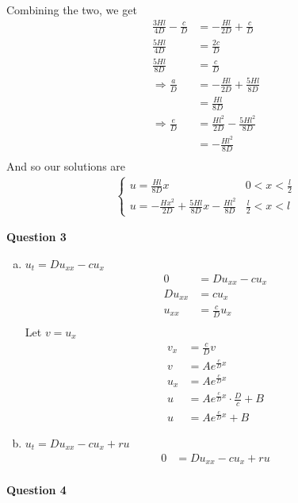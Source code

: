 \documentclass[12pt, letterpaper]{article}
\begin{document}
\begin{enumerate}[(a)]
\begin{enumerate}[(i)]
\begin{align*}
        \end{align*}
        Combining the two, we get
        \begin{align*}
            \frac{3Hl}{4D} - \frac cD &= -\frac{Hl}{2D} + \frac cD \\
            \frac{5Hl}{4D} &= \frac{2c}{D} \\
            \frac{5Hl}{8D} &= \frac cD \\
            \Rightarrow \frac aD &= -\frac{Hl}{2D} + \frac{5Hl}{8D} \\
            &= \frac{Hl}{8D} \\
            \Rightarrow \frac eD &= \frac{Hl^2}{2D} - \frac{5Hl^2}{8D} \\
            &= -\frac{Hl^2}{8D} \\
        \end{align*}
        And so our solutions are
        \begin{align*}
            \begin{cases}
                u = \displaystyle\frac{Hl}{8D}x  & 0 < x < \frac l2\\
                u = -\displaystyle\frac{Hx^2}{2D} + \frac{5Hl}{8D}x - \frac{Hl^2}{8D} & \frac l2 < x < l
            \end{cases}
        \end{align*}
    \end{enumerate}
\end{enumerate}

\noindent \textbf{Question 3}
\begin{enumerate}[(a)]
    \item $u_t = Du_{xx} - cu_x$ 
    \begin{align*}
        0 &= Du_{xx} - cu_x \\
        Du_{xx} &= cu_x \\ 
        u_{xx} &= \frac cD u_x \\
    \end{align*}
    Let $v = u_x$
    \begin{align*}
        v_x &= \frac cD v \\
        v &= Ae^{\frac{c}{D} x} \\
        u_x &= Ae^{\frac{c}{D} x} \\
        u &= Ae^{\frac{c}{D}x} \cdot \frac{D}{c} + B \\
        u &= Ae^{\frac cD x} + B
    \end{align*}
    \item $u_t = Du_{xx} - cu_x + ru$
    \begin{align*}
        0 &= Du_{xx} - cu_x + ru \\
    \end{align*}
\end{enumerate}

\noindent \textbf{Question 4}
\end{document}
